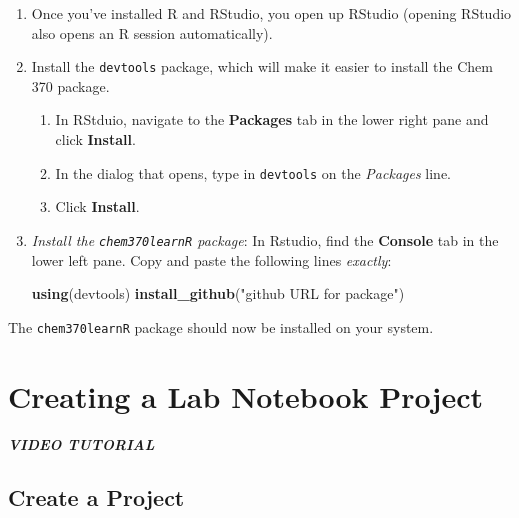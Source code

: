 \documentclass[]{tufte-book}
\newenvironment{Shaded}{}{}
\newcommand{\KeywordTok}[1]{\textcolor[rgb]{0.00,0.44,0.13}{\textbf{#1}}}
\newcommand{\NormalTok}[1]{#1}
\newcommand{\StringTok}[1]{\textcolor[rgb]{0.25,0.44,0.63}{#1}}
\providecommand{\tightlist}{%
  \setlength{\itemsep}{0pt}\setlength{\parskip}{0pt}}
\begin{document}
\begin{enumerate}
\def\labelenumi{\arabic{enumi}.}
\item
  Once you've installed R and RStudio, you open up RStudio (opening RStudio also opens an R session automatically).\\
\item
  Install the \texttt{devtools} package, which will make it easier to install the Chem 370 package.

  \begin{enumerate}
  \def\labelenumii{\arabic{enumii}.}
  \tightlist
  \item
    In RStduio, navigate to the \textbf{Packages} tab in the lower right pane and click \textbf{Install}.
  \item
    In the dialog that opens, type in \texttt{devtools} on the \emph{Packages} line.
  \item
    Click \textbf{Install}.
  \end{enumerate}
\item
  \emph{Install the \texttt{chem370learnR} package}: In Rstudio, find the \textbf{Console} tab in the lower left pane. Copy and paste the following lines \emph{exactly}:

\begin{Shaded}
\begin{Highlighting}[]
\KeywordTok{using}\NormalTok{(devtools)}
\KeywordTok{install_github}\NormalTok{(}\StringTok{"github URL for package"}\NormalTok{)}
\end{Highlighting}
\end{Shaded}
\end{enumerate}

The \texttt{chem370learnR} package should now be installed on your system.

\hypertarget{create-lab-notebook}{%
\section*{Creating a Lab Notebook Project}\label{create-lab-notebook}}

\textbf{\emph{VIDEO TUTORIAL}}

\hypertarget{create-a-project}{%
\subsection*{Create a Project}\label{create-a-project}}
\end{document}
